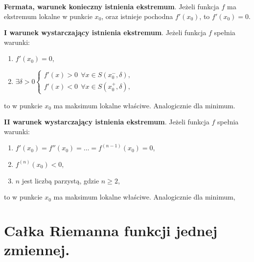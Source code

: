 \documentclass[main.tex]{subfiles}
\begin{document}
    \begin{theorem}
        \textbf{Fermata, warunek konieczny istnienia ekstremum}. Jeżeli funkcja $f$ ma ekstremum lokalne w punkcie $x_0$,
        oraz istnieje pochodna $f'(x_0)$, to $f'(x_0) = 0$.
    \end{theorem}

    \begin{theorem}
        \textbf{I warunek wystarczający istnienia ekstremum}. Jeżeli funkcja $f$ spełnia warunki:
        \begin{enumerate}
            \item $f'(x_0) = 0$,
            \item $\exists \delta > 0
            \left\{\begin{matrix}
                       f'(x) > 0 ~~ \forall x \in  S(x^{-}_0, \delta), \\
                       f'(x) < 0 ~~ \forall x \in  S(x^{+}_0, \delta),
            \end{matrix}\right.$
        \end{enumerate}
        to w punkcie $x_0$ ma maksimum lokalne właściwe. Analogicznie dla minimum.
    \end{theorem}

    \begin{theorem}
        \textbf{II warunek wystarczający istnienia ekstremum}. Jeżeli funkcja $f$ spełnia warunki:
        \begin{enumerate}
            \item $f'(x_0) = f''(x_0) = \dots = f^{(n-1)}(x_0) = 0$,
            \item $f^{(n)}(x_0) < 0$,
            \item $n$ jest liczbą parzystą, gdzie $n \geq 2$,
        \end{enumerate}
        to w punkcie $x_0$ ma maksimum lokalne właściwe. Analogicznie dla minimum,
    \end{theorem}


    \section{Całka Riemanna funkcji jednej zmiennej.}
\end{document}
